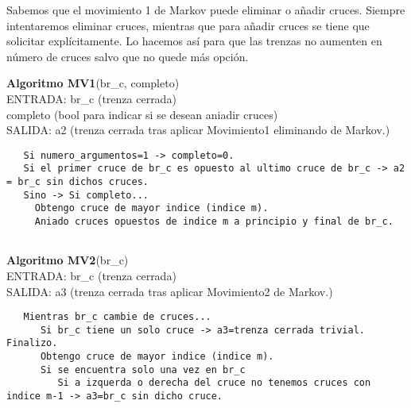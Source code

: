 Sabemos que el movimiento 1 de Markov puede eliminar o añadir cruces. Siempre intentaremos eliminar cruces, mientras que para añadir cruces se tiene que solicitar explícitamente. Lo hacemos así para que las trenzas no aumenten en número de cruces salvo que no quede más opción. \\ 

\begin{alg}
	\textbf{Algoritmo MV1}(br\_c, completo)\\
	ENTRADA: br\_c (trenza cerrada)\\
	\hspace*{2.2cm} completo (bool para indicar si se desean aniadir cruces)\\
	SALIDA: \hspace{0.4cm} a2 (trenza cerrada tras aplicar Movimiento1 eliminando de Markov.) 
	
\begin{lstlisting}
   Si numero_argumentos=1 -> completo=0.
   Si el primer cruce de br_c es opuesto al ultimo cruce de br_c -> a2 = br_c sin dichos cruces.
   Sino -> Si completo... 
     Obtengo cruce de mayor indice (indice m).
     Aniado cruces opuestos de indice m a principio y final de br_c.
      
\end{lstlisting}
\end{alg}

\begin{alg}
	\textbf{Algoritmo MV2}(br\_c)\\
	ENTRADA: br\_c (trenza cerrada)\\
	SALIDA: \hspace{0.4cm} a3 (trenza cerrada tras aplicar Movimiento2 de Markov.) 
	
\begin{lstlisting}
   Mientras br_c cambie de cruces...
      Si br_c tiene un solo cruce -> a3=trenza cerrada trivial. Finalizo.
      Obtengo cruce de mayor indice (indice m). 
      Si se encuentra solo una vez en br_c
         Si a izquerda o derecha del cruce no tenemos cruces con indice m-1 -> a3=br_c sin dicho cruce.
         
\end{lstlisting}
\end{alg}

